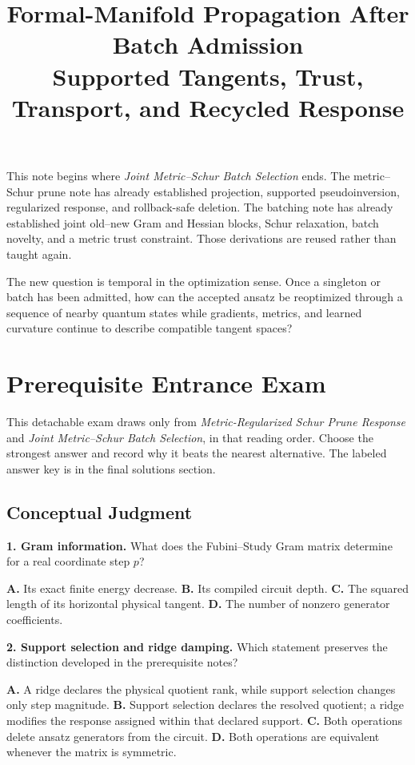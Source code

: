 \documentclass[10pt,twocolumn]{article}
\title{Formal-Manifold Propagation After Batch Admission\\
\large Supported Tangents, Trust, Transport, and Recycled Response}
\author{}
\date{}
\begin{document}
\maketitle
\vspace{-1.3em}

This note begins where \emph{Joint Metric--Schur Batch Selection} ends. The
metric--Schur prune note has already established projection, supported
pseudoinversion, regularized response, and rollback-safe deletion. The batching
note has already established joint old--new Gram and Hessian blocks, Schur
relaxation, batch novelty, and a metric trust constraint. Those derivations are
reused rather than taught again.

The new question is temporal in the optimization sense. Once a singleton or
batch has been admitted, how can the accepted ansatz be reoptimized through a
sequence of nearby quantum states while gradients, metrics, and learned
curvature continue to describe compatible tangent spaces?

\section*{Prerequisite Entrance Exam}

This detachable exam draws only from \emph{Metric-Regularized Schur Prune
Response} and \emph{Joint Metric--Schur Batch Selection}, in that reading
order. Choose the strongest answer and record why it beats the nearest
alternative. The labeled answer key is in the final solutions section.

\subsection*{Conceptual Judgment}

\textbf{1. Gram information.}
What does the Fubini--Study Gram matrix determine for a real coordinate step
\(p\)?

\textbf{A.} Its exact finite energy decrease.\quad
\textbf{B.} Its compiled circuit depth.\quad
\textbf{C.} The squared length of its horizontal physical tangent.\quad
\textbf{D.} The number of nonzero generator coefficients.

\textbf{2. Support selection and ridge damping.}
Which statement preserves the distinction developed in the prerequisite
notes?

\textbf{A.} A ridge declares the physical quotient rank, while support
selection changes only step magnitude.\quad
\textbf{B.} Support selection declares the resolved quotient; a ridge modifies
the response assigned within that declared support.\quad
\textbf{C.} Both operations delete ansatz generators from the circuit.\quad
\textbf{D.} Both operations are equivalent whenever the matrix is symmetric.
\end{document}

